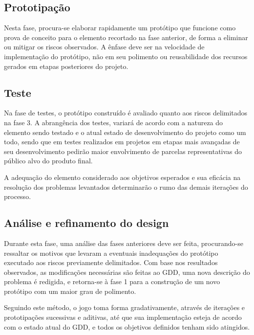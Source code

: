 \subsection{Prototipação}\label{subsec-met-prototipacao}

Nesta fase, procura-se elaborar rapidamente um protótipo que funcione como prova 
de conceito para o elemento recortado na fase anterior, de forma a eliminar ou 
mitigar os riscos observados. A ênfase deve ser na velocidade de implementação 
do protótipo, não em seu polimento ou reusabilidade dos recursos gerados em 
etapas posteriores do projeto.

\subsection{Teste}\label{subsec-met-teste}

Na fase de testes, o protótipo construído é avaliado quanto aos riscos 
delimitados na fase 3. A abrangência dos testes, variará de acordo com a natureza 
do elemento sendo testado e o atual estado de desenvolvimento do projeto como 
um todo, sendo que em testes realizados em projetos em etapas mais avançadas de 
seu desenvolvimento pedirão maior envolvimento de parcelas representativas 
do público alvo do produto final.

A adequação do elemento considerado aos objetivos esperados e sua eficácia 
na resolução dos problemas levantados determinarão o rumo das demais iterações 
do processo.

\subsection{Análise e refinamento do design}\label{subsec-met-analise-refinamento}

Durante esta fase, uma análise das fases anteriores deve ser feita, 
procurando-se ressaltar os motivos que levaram a eventuais inadequações do 
protótipo executado aos riscos previamente delimitados. Com base nos 
resultados observados, as modificações necessárias são feitas ao GDD, uma 
nova descrição do problema é redigida, e retorna-se à fase 1 para a construção 
de um novo protótipo com um maior grau de polimento.

Seguindo este método, o jogo toma forma gradativamente, através de iterações 
e prototipações sucessivas e aditivas, até que sua implementação esteja de 
acordo com o estado atual do GDD, e todos os objetivos definidos tenham 
sido atingidos.

